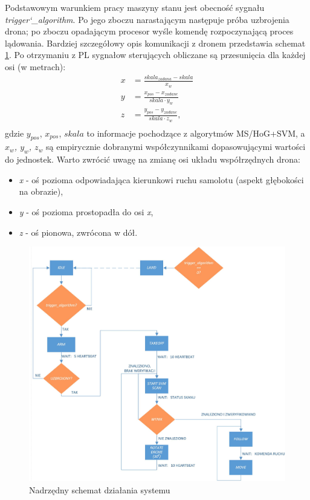Podstawowym warunkiem pracy maszyny stanu jest obecność sygnału \textit{trigger\char`_algorithm}. Po jego zboczu narastającym następuje próba uzbrojenia drona; po zboczu opadającym procesor wyśle komendę rozpoczynającą proces lądowania. Bardziej szczegółowy opis komunikacji z dronem przedstawia schemat \ref{fig:PL_FSM_sch}.
Po otrzymaniu z PL sygnałow sterujących obliczane są przesunięcia dla każdej osi (w metrach):
\begin{equation}
\left.\begin{aligned}
x&= \frac{skala_{zadana}-skala}{x_w}\\
y&= \frac{x_{pos}-x_{zadane}}{skala\cdot y_w}\\
z&= \frac{y_{pos}-y_{zadane}}{skala\cdot z_w},\\
\end{aligned}\right.
\end{equation}
gdzie $y_{pos}$, $x_{pos}$, $skala$ to informacje pochodzące z algorytmów MS/HoG+SVM, a \textit{$x_w$, $y_w$, $z_w$} są empirycznie dobranymi współczynnikami dopasowującymi wartości do jednostek. Warto zwrócić uwagę na zmianę osi układu współrzędnych drona:
\begin{itemize}
	\item \textit{x} - oś pozioma odpowiadająca kierunkowi ruchu samolotu (aspekt głębokości na obrazie),
	\item \textit{y} - oś pozioma prostopadła do osi \textit{x},
	\item \textit{z} - oś pionowa, zwrócona w dół.
\end{itemize}

\begin{figure}[h]
\centering
\includegraphics[width=16cm]{5_PS_FSM.jpg}
\caption{Nadrzędny schemat działania systemu}
\label{fig:PL_FSM_sch}
\end{figure}